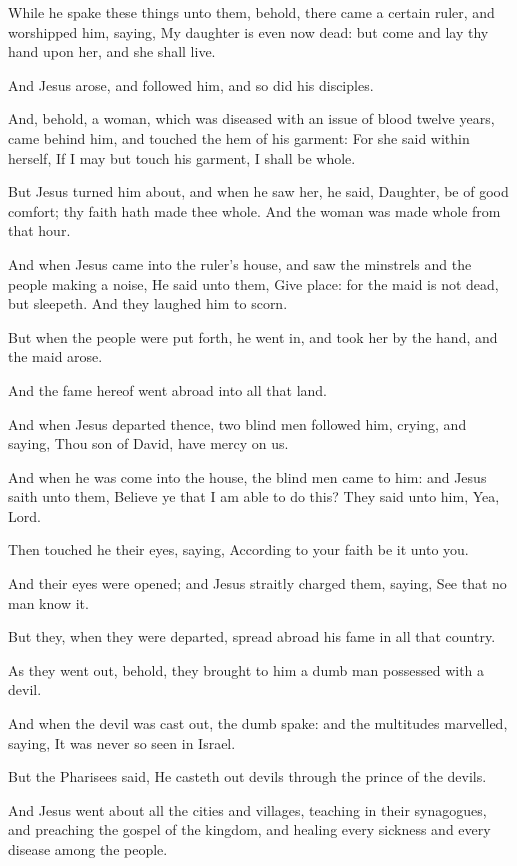 \verse While he spake these things unto them, behold, there came a certain ruler, and worshipped him, saying, My daughter is even now dead: but come and lay thy hand upon her, and she shall live.

\verse And Jesus arose, and followed him, and so did his disciples.

\verse And, behold, a woman, which was diseased with an issue of blood twelve years, came behind him, and touched the hem of his garment: \verse For she said within herself, If I may but touch his garment, I shall be whole.

\verse But Jesus turned him about, and when he saw her, he said, Daughter, be of good comfort; thy faith hath made thee whole. And the woman was made whole from that hour.

\verse And when Jesus came into the ruler's house, and saw the minstrels and the people making a noise, \verse He said unto them, Give place: for the maid is not dead, but sleepeth. And they laughed him to scorn.

\verse But when the people were put forth, he went in, and took her by the hand, and the maid arose.

\verse And the fame hereof went abroad into all that land.

\verse And when Jesus departed thence, two blind men followed him, crying, and saying, Thou son of David, have mercy on us.

\verse And when he was come into the house, the blind men came to him: and Jesus saith unto them, Believe ye that I am able to do this? They said unto him, Yea, Lord.

\verse Then touched he their eyes, saying, According to your faith be it unto you.

\verse And their eyes were opened; and Jesus straitly charged them, saying, See that no man know it.

\verse But they, when they were departed, spread abroad his fame in all that country.

\verse As they went out, behold, they brought to him a dumb man possessed with a devil.

\verse And when the devil was cast out, the dumb spake: and the multitudes marvelled, saying, It was never so seen in Israel.

\verse But the Pharisees said, He casteth out devils through the prince of the devils.

\verse And Jesus went about all the cities and villages, teaching in their synagogues, and preaching the gospel of the kingdom, and healing every sickness and every disease among the people.

